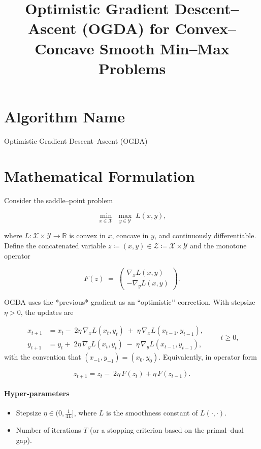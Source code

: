 \documentclass{article}
\newcommand{\R}{\mathbb{R}}
\begin{document}
\title{Optimistic Gradient Descent–Ascent (OGDA) for Convex–Concave Smooth Min–Max Problems}
\author{}
\date{}
\maketitle

\tableofcontents
\newpage

\section*{Algorithm Name}
Optimistic Gradient Descent–Ascent (OGDA)

\section{Mathematical Formulation}
Consider the saddle–point problem  

\[
\min_{x\in\mathcal X}\;\max_{y\in\mathcal Y}\;L(x,y),
\]

where $L:\mathcal X\times\mathcal Y\rightarrow\R$ is convex in $x$, concave in $y$, and continuously differentiable.  
Define the concatenated variable $z\coloneqq (x,y)\in\mathcal Z\coloneqq\mathcal X\times\mathcal Y$ and the monotone operator  

\[
F(z)\;=\;\begin{pmatrix}
\nabla_x L(x,y)\\[2mm]
-\nabla_y L(x,y)
\end{pmatrix}.
\]

OGDA uses the *previous* gradient as an “optimistic’’ correction.  
With stepsize $\eta>0$, the updates are  

\[
\boxed{
\begin{aligned}
x_{t+1}&=x_t-\;2\eta\,\nabla_x L(x_t,y_t)\;+\;\eta\,\nabla_x L(x_{t-1},y_{t-1}),\\[2mm]
y_{t+1}&=y_t+\;2\eta\,\nabla_y L(x_t,y_t)\;-\;\eta\,\nabla_y L(x_{t-1},y_{t-1}),
\end{aligned}}
\qquad t\ge 0,
\]
with the convention that $(x_{-1},y_{-1})=(x_0,y_0)$.  
Equivalently, in operator form  

\[
z_{t+1}=z_t-\;2\eta\,F(z_t)+\eta\,F(z_{t-1}). \tag{1}
\]

\paragraph{Hyper‑parameters}
\begin{itemize}
\item Stepsize $\eta\in(0,\frac{1}{4L}]$, where $L$ is the smoothness constant of $L(\cdot,\cdot)$.
\item Number of iterations $T$ (or a stopping criterion based on the primal–dual gap).
\end{itemize}
\end{document}
